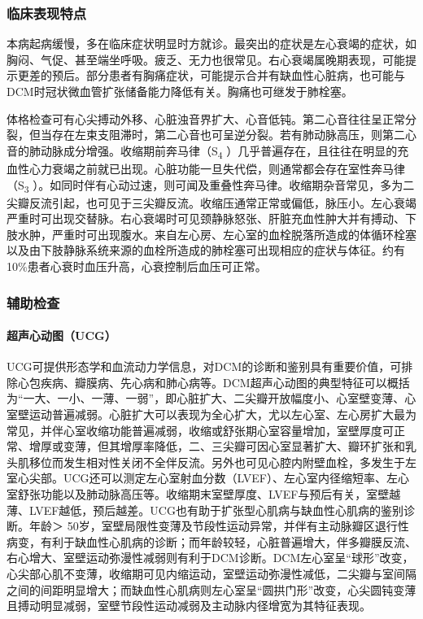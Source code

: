 \subsubsection{临床表现特点}

本病起病缓慢，多在临床症状明显时方就诊。最突出的症状是左心衰竭的症状，如胸闷、气促、甚至端坐呼吸。疲乏、无力也很常见。右心衰竭属晚期表现，可能提示更差的预后。部分患者有胸痛症状，可能提示合并有缺血性心脏病，也可能与DCM时冠状微血管扩张储备能力降低有关。胸痛也可继发于肺栓塞。

体格检查可有心尖搏动外移、心脏浊音界扩大、心音低钝。第二心音往往呈正常分裂，但当存在左束支阻滞时，第二心音也可呈逆分裂。若有肺动脉高压，则第二心音的肺动脉成分增强。收缩期前奔马律（S\textsubscript{4}
）几乎普遍存在，且往往在明显的充血性心力衰竭之前就已出现。心脏功能一旦失代偿，则通常都会存在室性奔马律（S\textsubscript{3}
）。如同时伴有心动过速，则可闻及重叠性奔马律。收缩期杂音常见，多为二尖瓣反流引起，也可见于三尖瓣反流。收缩压通常正常或偏低，脉压小。左心衰竭严重时可出现交替脉。右心衰竭时可见颈静脉怒张、肝脏充血性肿大并有搏动、下肢水肿，严重时可出现腹水。来自左心房、左心室的血栓脱落所造成的体循环栓塞以及由下肢静脉系统来源的血栓所造成的肺栓塞可出现相应的症状与体征。约有10\%患者心衰时血压升高，心衰控制后血压可正常。

\subsubsection{辅助检查}

\paragraph{超声心动图（UCG）}

UCG可提供形态学和血流动力学信息，对DCM的诊断和鉴别具有重要价值，可排除心包疾病、瓣膜病、先心病和肺心病等。DCM超声心动图的典型特征可以概括为“一大、一小、一薄、一弱”，即心脏扩大、二尖瓣开放幅度小、心室壁变薄、心室壁运动普遍减弱。心脏扩大可以表现为全心扩大，尤以左心室、左心房扩大最为常见，并伴心室收缩功能普遍减弱，收缩或舒张期心室容量增加，室壁厚度可正常、增厚或变薄，但其增厚率降低，二、三尖瓣可因心室显著扩大、瓣环扩张和乳头肌移位而发生相对性关闭不全伴反流。另外也可见心腔内附壁血栓，多发生于左室心尖部。UCG还可以测定左心室射血分数（LVEF）、左心室内径缩短率、左心室舒张功能以及肺动脉高压等。收缩期末室壁厚度、LVEF与预后有关，室壁越薄、LVEF越低，预后越差。UCG也有助于扩张型心肌病与缺血性心肌病的鉴别诊断。年龄＞
50岁，室壁局限性变薄及节段性运动异常，并伴有主动脉瓣区退行性病变，有利于缺血性心肌病的诊断；而年龄较轻，心脏普遍增大，伴多瓣膜反流、右心增大、室壁运动弥漫性减弱则有利于DCM诊断。DCM左心室呈“球形”改变，心尖部心肌不变薄，收缩期可见内缩运动，室壁运动弥漫性减低，二尖瓣与室间隔之间的间距明显增大；而缺血性心肌病则左心室呈“圆拱门形”改变，心尖圆钝变薄且搏动明显减弱，室壁节段性运动减弱及主动脉内径增宽为其特征表现。

